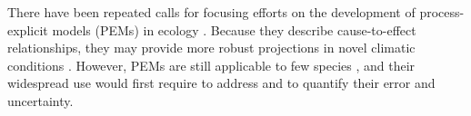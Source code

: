 \documentclass[letterpaper,8pt]{extarticle}  %
\begin{document}
\begin{doublespacing}
\begin{linenumbers}



There have been repeated calls for focusing efforts on the development of process-explicit models (PEMs) in ecology \citep{Urban2016, Singer2016, Pilowsky2022}. Because they describe cause-to-effect relationships, they may provide more robust projections in novel climatic conditions \citep{VanderMeersch2024}. However, PEMs are still applicable to few species \citep{Evans2016}, and their widespread use would first require to address and to quantify their error and uncertainty.


\end{linenumbers}
\end{doublespacing}
\end{document}
